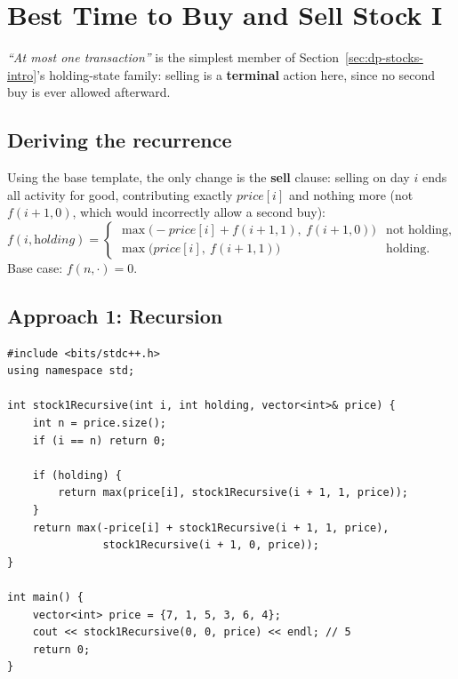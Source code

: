\section{Best Time to Buy and Sell Stock I}
\label{sec:dp-stock-1}


\begin{patternbox}
\emph{``At most one transaction''} is the simplest member of
Section~\ref{sec:dp-stocks-intro}'s holding-state family: selling is a
\textbf{terminal} action here, since no second buy is ever allowed
afterward.
\end{patternbox}

\subsection*{Deriving the recurrence}

Using the base template, the only change is the \textbf{sell} clause:
selling on day $i$ ends all activity for good, contributing exactly
$\textit{price}[i]$ and nothing more (not $f(i{+}1,0)$, which would
incorrectly allow a second buy):
\[
  f(i, \textit{holding}) =
  \begin{cases}
    \max\big(-\textit{price}[i] + f(i{+}1, 1),\ f(i{+}1, 0)\big) &
    \text{not holding}, \\
    \max\big(\textit{price}[i],\ f(i{+}1, 1)\big) & \text{holding.}
  \end{cases}
\]
Base case: $f(n, \cdot) = 0$.

\subsection*{Approach 1: Recursion}

\begin{lstlisting}
#include <bits/stdc++.h>
using namespace std;

int stock1Recursive(int i, int holding, vector<int>& price) {
    int n = price.size();
    if (i == n) return 0;

    if (holding) {
        return max(price[i], stock1Recursive(i + 1, 1, price));
    }
    return max(-price[i] + stock1Recursive(i + 1, 1, price),
               stock1Recursive(i + 1, 0, price));
}

int main() {
    vector<int> price = {7, 1, 5, 3, 6, 4};
    cout << stock1Recursive(0, 0, price) << endl; // 5
    return 0;
}
\end{lstlisting}

